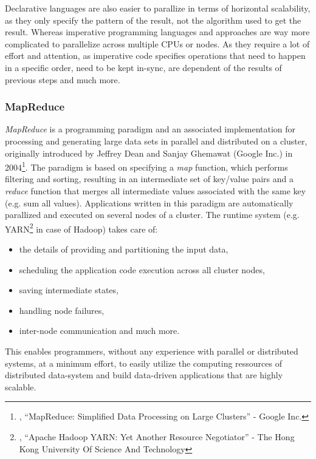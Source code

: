 {Declarative languages are also easier to parallize in terms of horizontal scalability, as they only specify the pattern of the result, not the algorithm used to get the result. Whereas imperative programming languages and approaches are way more complicated to parallelize across multiple CPUs or nodes. As they require a lot of effort and attention, as imperative code specifies operations that need to happen in a specific order, need to be kept in-sync, are dependent of the results of previous steps and much more.\\


\subsubsection{MapReduce}
\label{tf_dma_dataaccess_mr}
\textit{MapReduce} is a programming paradigm and an associated implementation for processing and generating large data sets in parallel and distributed on a cluster, originally introduced by Jeffrey Dean and Sanjay Ghemawat (Google Inc.) in 2004\footnote{\cite{GOOMR}, ``MapReduce: Simplified Data Processing on Large Clusters'' - Google Inc.}. The paradigm is based on specifying a \textit{map} function, which performs filtering and sorting, resulting in an intermediate set of key/value pairs and a \textit{reduce} function that merges all intermediate values associated with the same key (e.g. sum all values).
Applications written in this paradigm are automatically parallized and executed on several nodes of a cluster. The runtime system (e.g. YARN\footnote{\cite{YARNPP}, ``Apache Hadoop YARN: Yet Another Resource Negotiator'' - The Hong Kong University Of Science And Technology} in case of Hadoop) takes care of: 
\begin{samepage}
\begin{itemize}
\item the details of providing and partitioning the input data, 
\item scheduling the application code execution across all cluster nodes, 
\item saving intermediate states,
\item handling node failures,
\item inter-node communication and much more.\\
\end{itemize}
\end{samepage}
This enables programmers, without any experience with parallel or distributed systems, at a minimum effort, to easily utilize the computing ressources of distributed data-system and build data-driven applications that are highly scalable. 

}
